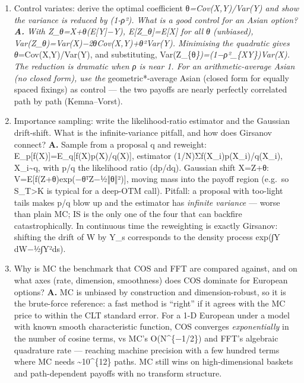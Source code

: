 \documentclass[
  11pt,
]{article}
\begin{document}
\begin{enumerate}
  Î=(1/M)Σ½(f(U\_i)+f(1−U\_i)), unbiased. Per pair,
  Var(½(f(U)+f(1−U)))=½Var(f(U))+½Cov(f(U),f(1−U)). Comparing with the
  plain estimator on the same 2M evaluations, antithetic wins iff
  Cov(f(U),f(1−U))\textless0, which is guaranteed when f is monotone (by
  the FKG/correlation lemma: f increasing ⇒ −f(1−·) increasing ⇒
  Cov(f(U),f(1−U))≤0). It can backfire for strongly non-monotone payoffs
  (e.g.~a straddle).
\item
  Control variates: derive the optimal coefficient
  θ\emph{=Cov(X,Y)/Var(Y) and show the variance is reduced by (1-ρ²).
  What is a good control for an Asian option? \textbf{A.} With
  Z\_θ=X+θ(E{[}Y{]}−Y), E{[}Z\_θ{]}=E{[}X{]} for all θ (unbiased),
  Var(Z\_θ)=Var(X)−2θCov(X,Y)+θ²Var(Y). Minimising the quadratic gives
  θ}=Cov(X,Y)/Var(Y), and substituting,
  Var(Z\_\{θ\emph{\})=(1−ρ²\_\{XY\})Var(X). The reduction is dramatic
  when \textbar ρ\textbar{} is near 1. For an arithmetic-average Asian
  (no closed form), use the }geometric*-average Asian (closed form for
  equally spaced fixings) as control --- the two payoffs are nearly
  perfectly correlated path by path (Kemna--Vorst).
\item
  Importance sampling: write the likelihood-ratio estimator and the
  Gaussian drift-shift. What is the infinite-variance pitfall, and how
  does Girsanov connect? \textbf{A.} Sample from a proposal q and
  reweight: E\_p{[}f(X){]}=E\_q{[}f(X)p(X)/q(X){]}, estimator
  (1/N)Σf(X\_i)p(X\_i)/q(X\_i), X\_i\textasciitilde q, with p/q the
  likelihood ratio (dp/dq). Gaussian shift X=Z+θ:
  V=E{[}f(Z+θ)exp(−θᵀZ−½‖θ‖²){]}, moving mass into the payoff region
  (e.g.~so S\_T\textgreater K is typical for a deep-OTM call). Pitfall:
  a proposal with too-light tails makes p/q blow up and the estimator
  has \emph{infinite variance} --- worse than plain MC; IS is the only
  one of the four that can backfire catastrophically. In continuous time
  the reweighting is exactly Girsanov: shifting the drift of W by Y\_s
  corresponds to the density process exp(∫Y dW−½∫Y²ds).
\item
  Why is MC the benchmark that COS and FFT are compared against, and on
  what axes (rate, dimension, smoothness) does COS dominate for European
  options? \textbf{A.} MC is unbiased by construction and
  dimension-robust, so it is the brute-force reference: a fast method is
  ``right'' if it agrees with the MC price to within the CLT standard
  error. For a 1-D European under a model with known smooth
  characteristic function, COS converges \emph{exponentially} in the
  number of cosine terms, vs MC's O(N\^{}\{−1/2\}) and FFT's algebraic
  quadrature rate --- reaching machine precision with a few hundred
  terms where MC needs \textasciitilde10\^{}\{12\} paths. MC still wins
  on high-dimensional baskets and path-dependent payoffs with no
  transform structure.
\end{enumerate}
\end{document}
